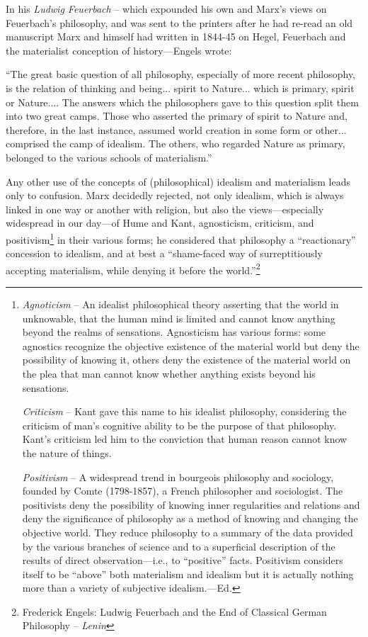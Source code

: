 \documentclass[a4paper,12pt]{book}
\newcommand{\q}[1]{``#1''}
\begin{document}
In his \emph{Ludwig Feuerbach} -- which expounded his own and Marx’s views on Feuerbach’s philosophy, and was sent to the printers after he had re-read an old manuscript Marx and himself had written in 1844-45 on Hegel, Feuerbach and the materialist conception of history—Engels wrote:

\begin{center}
	\footnotesize{\q{The great basic question of all philosophy, especially of more recent philosophy, is the relation of thinking and being... spirit to Nature... which is primary, spirit or Nature.... The answers which the philosophers gave to this question split them into two great camps. Those who asserted the primary of spirit to Nature and, therefore, in the last instance, assumed world creation in some form or other... comprised the camp of idealism. The others, who regarded Nature as primary, belonged to the various schools of materialism.}}
\end{center}

Any other use of the concepts of (philosophical) idealism and materialism leads only to confusion. Marx decidedly rejected, not only idealism, which is always linked in one way or another with religion, but also the views—especially widespread in our day—of Hume and Kant, agnosticism, criticism, and positivism\footnote{\emph{Agnoticism} -- An idealist philosophical theory asserting that the world in unknowable, that the human mind is limited and cannot know anything beyond the realms of sensations. Agnosticism has various forms: some agnostics recognize the objective existence of the material world but deny the possibility of knowing it, others deny the existence of the material world on the plea that man cannot know whether anything exists beyond his sensations.

	\emph{Criticism} -- Kant gave this name to his idealist philosophy, considering the criticism of man’s cognitive ability to be the purpose of that philosophy. Kant’s criticism led him to the conviction that human reason cannot know the nature of things.

	\emph{Positivism} -- A widespread trend in bourgeois philosophy and sociology, founded by Comte (1798-1857), a French philosopher and sociologist. The positivists deny the possibility of knowing inner regularities and relations and deny the significance of philosophy as a method of knowing and changing the objective world. They reduce philosophy to a summary of the data provided by the various branches of science and to a superficial description of the results of direct observation—i.e., to “positive” facts. Positivism considers itself to be “above” both materialism and idealism but it is actually nothing more than a variety of subjective idealism.—Ed.} in their various forms; he considered that philosophy a “reactionary” concession to idealism, and at best a “shame-faced way of surreptitiously accepting materialism, while denying it before the world.”\footnote{Frederick Engels: Ludwig Feuerbach and the End of Classical German Philosophy -- \emph{Lenin}}
\end{document}
